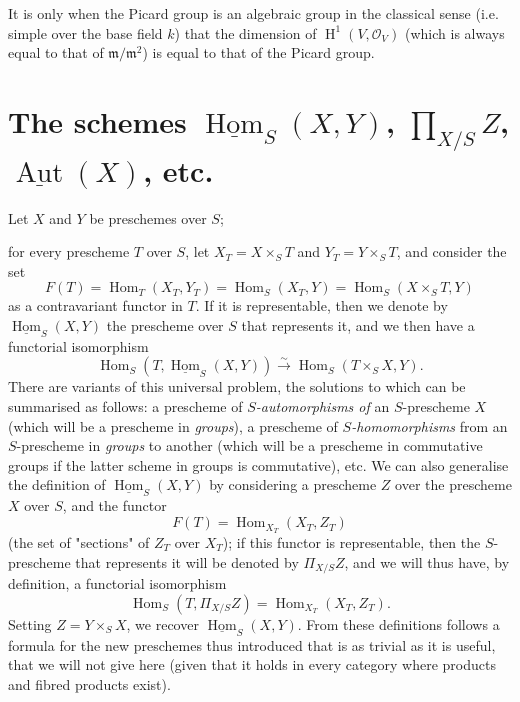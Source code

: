   It is only when the Picard group is an algebraic group in the classical sense (i.e. simple over the base field \(k\)) that the dimension of \(\operatorname {H}^1(V,\mathscr {O}_V)\) (which is always equal to that of \(\mathfrak {m}/\mathfrak {m}^2\)) is equal to that of the Picard group.\section{The schemes \(\underline {\operatorname {Hom}}_S(X,Y)\), \(\prod _{X/S}Z\), \(\underline {\operatorname {Aut}}(X)\), etc.}\label{fga3.ii-c.2}\par{}Let \(X\) and \(Y\) be preschemes over \(S\);
  
  for every prescheme \(T\) over \(S\), let \(X_T=X\times _S T\) and \(Y_T=Y\times _S T\), and consider the set
  \[     F(T)     = \operatorname {Hom}_T(X_T,Y_T)     = \operatorname {Hom}_S(X_T,Y)     = \operatorname {Hom}_S(X\times _S T,Y)   \]
  as a contravariant functor in \(T\).
  If it is representable, then we denote by \(\underline {\operatorname {Hom}}_S(X,Y)\) the prescheme over \(S\) that represents it, and we then have a functorial isomorphism
  \[     \operatorname {Hom}_S(T,\underline {\operatorname {Hom}}_S(X,Y)) \xrightarrow {\sim } \operatorname {Hom}_S(T\times _S X,Y).   \]
  There are variants of this universal problem, the solutions to which can be summarised as follows: a prescheme of \emph{\(S\)-automorphisms of} an \(S\)-prescheme \(X\) (which will be a prescheme in \emph{groups}), a prescheme of \emph{\(S\)-homomorphisms} from an \(S\)-prescheme in \emph{groups} to another (which will be a prescheme in commutative groups if the latter scheme in groups is commutative), etc.
  We can also generalise the definition of \(\underline {\operatorname {Hom}}_S(X,Y)\) by considering a prescheme \(Z\) over the prescheme \(X\) over \(S\), and the functor
  \[     F(T)     = \operatorname {Hom}_{X_T}(X_T,Z_T)   \]
  (the set of "sections" of \(Z_T\) over \(X_T\));
  if this functor is representable, then the \(S\)-prescheme that represents it will be denoted by \(\Pi _{X/S}Z\), and we will thus have, by definition, a functorial isomorphism
  \[     \operatorname {Hom}_S(T,\Pi _{X/S}Z)     = \operatorname {Hom}_{X_T}(X_T,Z_T).   \]
  Setting \(Z=Y\times _S X\), we recover \(\underline {\operatorname {Hom}}_S(X,Y)\).
  From these definitions follows a formula for the new preschemes thus introduced that is as trivial as it is useful, that we will not give here (given that it holds in every category where products and fibred products exist).

